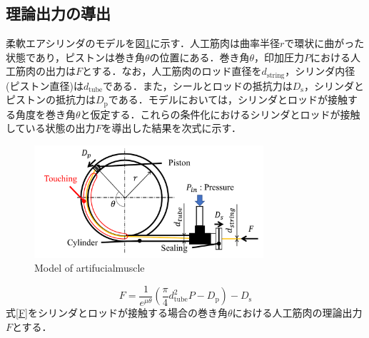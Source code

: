 \subsection{理論出力の導出}%
柔軟エアシリンダのモデルを図\ref{Model of artifucialmuscle}に示す．人工筋肉は曲率半径$r$で環状に曲がった状態であり，ピストンは巻き角$\theta$の位置にある．巻き角$\theta$，印加圧力$P$における人工筋肉の出力は$F$とする．なお，人工筋肉のロッド直径を$d_\mathrm{string}$，シリンダ内径(ピストン直径)は$d_\mathrm{tube}$である．また，シールとロッドの抵抗力は$D_\mathrm{s}$，シリンダとピストンの抵抗力は$D_\mathrm{p}$である．モデルにおいては，シリンダとロッドが接触する角度を巻き角$\theta$と仮定する．これらの条件化におけるシリンダとロッドが接触している状態の出力$F$を導出した結果を次式に示す．
\begin{figure}[t]
  \centering
  \includegraphics[width=85mm]{_pdf/model_artifucialmuscle.pdf}
  \caption{Model of artifucialmuscle}
  \label{Model of artifucialmuscle}
\end{figure}

\begin{equation}
  \label{F}
  F=\frac{1}{e^{\mu\theta}} (\frac{π}{4}d_\mathrm{tube}^2 P-D_\mathrm{p} )-D_\mathrm{s}
\end{equation}
式\eqref{F}をシリンダとロッドが接触する場合の巻き角$\theta$における人工筋肉の理論出力$F$とする．

